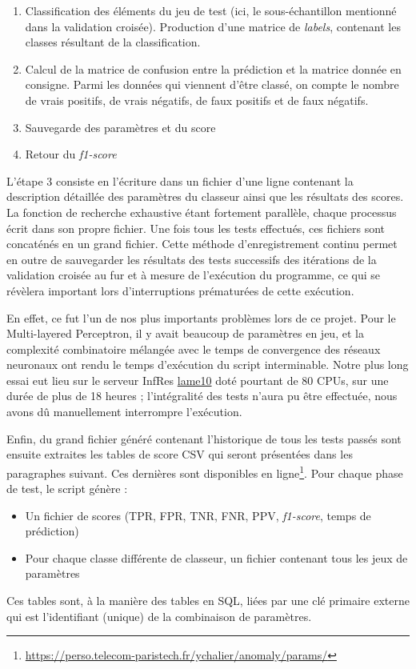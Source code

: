 \documentclass[a4paper]{report}
\begin{document}
\begin{enumerate}
\item Classification des éléments du jeu de test (ici, le sous-échantillon mentionné dans la validation croisée). Production d'une matrice de \emph{labels}, contenant les classes résultant de la classification.
\item Calcul de la matrice de confusion entre la prédiction et la matrice donnée en consigne. Parmi les données qui viennent d'être classé, on compte le nombre de vrais positifs, de vrais négatifs, de faux positifs et de faux négatifs.
\item Sauvegarde des paramètres et du score
\item Retour du \emph{f1-score}
\end{enumerate}

L'étape 3 consiste en l'écriture dans un fichier d'une ligne contenant la description détaillée des paramètres du classeur ainsi que les résultats des scores. La fonction de recherche exhaustive étant fortement parallèle, chaque processus écrit dans son propre fichier. Une fois tous les tests effectués, ces fichiers sont concaténés en un grand fichier. Cette méthode d'enregistrement continu permet en outre de sauvegarder les résultats des tests successifs des itérations de la validation croisée au fur et à mesure de l'exécution du programme, ce qui se révèlera important lors d'interruptions prématurées de cette exécution.

En effet, ce fut l'un de nos plus importants problèmes lors de ce projet. Pour le Multi-layered Perceptron, il y avait beaucoup de paramètres en jeu, et la complexité combinatoire mélangée avec le temps de convergence des réseaux neuronaux ont rendu le temps d'exécution du script interminable. Notre plus long essai eut lieu sur le serveur InfRes \href{http://lame10.enst.fr}{lame10} doté pourtant de 80 CPUs, sur une durée de plus de 18 heures ; l'intégralité des tests n'aura pu être effectuée, nous avons dû manuellement interrompre l'exécution.

Enfin, du grand fichier généré contenant l'historique de tous les tests passés sont ensuite extraites les tables de score CSV qui seront présentées dans les paragraphes suivant. Ces dernières sont disponibles en ligne\footnote{\url{https://perso.telecom-paristech.fr/ychalier/anomaly/params/}}. Pour chaque phase de test, le script génère :
\begin{itemize}
\item Un fichier de scores (TPR, FPR, TNR, FNR, PPV, \emph{f1-score}, temps de prédiction)
\item Pour chaque classe différente de classeur, un fichier contenant tous les jeux de paramètres
\end{itemize}
Ces tables sont, à la manière des tables en SQL, liées par une clé primaire externe qui est l'identifiant (unique) de la combinaison de paramètres.
\end{document}
